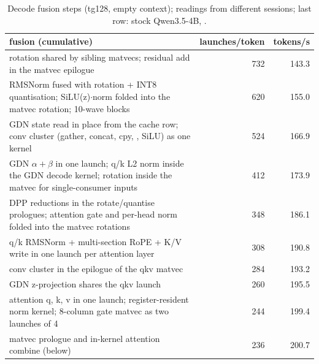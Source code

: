 \documentclass[10.5pt,a4paper]{article}
\newcommand{\tx}[1]{\texttt{\detokenize{#1}}}
\begin{document}
\begin{table}[!ht]
\centering\small
\begin{tabularx}{\linewidth}{@{}>{\raggedright\arraybackslash}Xrr@{}}
\toprule
fusion (cumulative) & launches/token & tokens/s\\
\midrule
rotation shared by sibling matvecs; residual add in the matvec epilogue & 732 & 143.3\\
RMSNorm fused with rotation + INT8 quantisation; SiLU(z)$\cdot$norm folded into the \tx{ssm_out} matvec rotation; 10-wave blocks & 620 & 155.0\\
GDN state read in place from the cache row; conv cluster (gather, concat, cpy, \tx{ssm_conv}, SiLU) as one kernel & 524 & 166.9\\
GDN $\alpha{+}\beta$ in one launch; q/k L2 norm inside the GDN decode kernel; rotation inside the matvec for single-consumer inputs & 412 & 173.9\\
DPP reductions in the rotate/quantise prologues; attention gate and per-head norm folded into the matvec rotations & 348 & 186.1\\
q/k RMSNorm + multi-section RoPE + K/V write in one launch per attention layer & 308 & 190.8\\
conv cluster in the epilogue of the qkv matvec & 284 & 193.2\\
GDN z-projection shares the qkv launch & 260 & 195.5\\
attention q, k, v in one launch; register-resident norm kernel; 8-column gate matvec as two launches of 4 & 244 & 199.4\\
matvec prologue and in-kernel attention combine (below) & 236 & 200.7\\
\bottomrule
\end{tabularx}
\caption{Decode fusion steps (tg128, empty context); readings from different sessions; last row: stock Qwen3.5-4B, \tx{quality}.}
\end{table}
\end{document}
